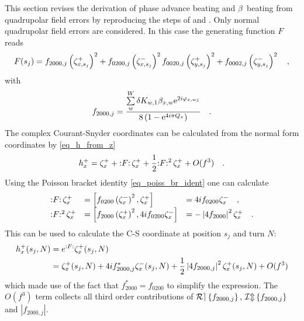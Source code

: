 This section revises the derivation of phase advance beating and $\beta$~beating from quadrupolar field errors
by reproducing the steps of \cite{Franchi2014} and \cite{Franchi2016}. 
Only normal quadrupolar field errors are considered.
In this case the generating function $F$ reads
%
\begin{equation}
  F(s_j) =
  f_{2000,j} \left( \zeta_{x,s_j}^+ \right) ^2 + f_{0200,j} \left( \zeta_{x,s_j}^- \right)^2 \notag
  f_{0020,j} \left( \zeta_{y,s_j}^+ \right) ^2 + f_{0002,j} \left( \zeta_{y,s_j}^- \right)^2 \notag
  \quad ,
  \label{eq_F_quad}
\end{equation}
%
with
%
\begin{equation}
    f_{2000,j} = \frac{
        \sum\limits_w^W \delta K_{w,1}\beta_{x,w}\text{e}^{2i\varphi_{x,wj}}
    }{
        8\left( 1-\text{e}^{4i\pi Q_x}\right)
    }
    \quad .
    \label{eq_f2000}
\end{equation}
%
The complex Courant-Snyder coordinates can be calculated from the normal form coordinates by
\eqref{eq_h_from_z}
%
\begin{equation}
    h_x^+ = \zeta_x^+ + {:}F{:}\, \zeta_x^+ +  \frac{1}{2} {:}F{:}^{2}\, \zeta_x^+ + O(f^3)
    \quad .
\end{equation}
%
Using the Poisson bracket identity \eqref{eq_poiss_br_ident} one can calculate
%
\begin{equation}
\begin{matrix*}[l]
     \liemap{F} \zxp  &= \left[f_{0200} \zxmto{2}, \zxp \right]  &= 4i f_{0200} \zxm \komma\notag \\
     \liemapn{F}{2}\zxp &= \left[f_{2000} \zxpto{2}, 4i f_{0200} \zxm \right]
      &= - \left| 4f_{2000}\right|^2 \zxp
     \fstop
\end{matrix*}
\end{equation}
%
This can be used to calculate the C-S coordinate at position $s_j$ and turn $N$:
%
\begin{align}
  h_x^+(s_j, N) &= e^{:F:}\zeta_{x}^+(s_j,N) \notag \\
  &= \zeta_{x}^+(s_j,N) + 4if_{2000,j}^* \zeta_{x}^-(s_j,N) 
  + \frac{1}{2}\left| 4 f_{2000,j} \right|^2 \zeta_{x}^+(s_j,N) +
  O(f^3)
  \label{eq_h_2ndorder}
\end{align}
%
which made use of the fact that $f_{2000}^* = f_{0200}$ to simplify the expression.
The $O(f^3) $ term collects all third order contributions of $\mathcal{Re} \left\{ f_{2000,j} \right\},\,\mathcal{Im} \left\{ f_{2000,j} \right\}$ and 
$\left| f_{2000,j}\right|$.

